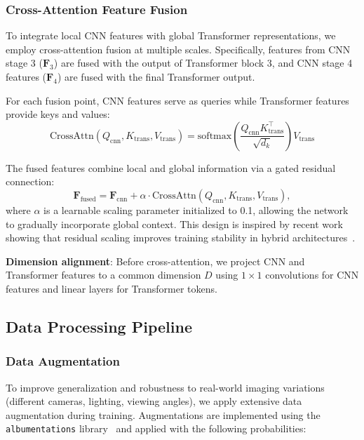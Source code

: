 \subsubsection{Cross-Attention Feature Fusion}

To integrate local CNN features with global Transformer representations, we employ cross-attention fusion at multiple scales. Specifically, features from CNN stage 3 ($\mathbf{F}_3$) are fused with the output of Transformer block 3, and CNN stage 4 features ($\mathbf{F}_4$) are fused with the final Transformer output.

For each fusion point, CNN features serve as queries while Transformer features provide keys and values:
\begin{equation}
\mathrm{CrossAttn}(Q_{\text{cnn}}, K_{\text{trans}}, V_{\text{trans}})
=
\mathrm{softmax}\!\left(
\frac{Q_{\text{cnn}} K_{\text{trans}}^\top}{\sqrt{d_k}}
\right)
V_{\text{trans}}
\end{equation}



The fused features combine local and global information via a gated residual connection:
\begin{equation}
\mathbf{F}_{\text{fused}} =
\mathbf{F}_{\text{cnn}} + \alpha \cdot
\mathrm{CrossAttn}(Q_{\text{cnn}}, K_{\text{trans}}, V_{\text{trans}}),
\label{eq:fusion}
\end{equation}
where $\alpha$ is a learnable scaling parameter initialized to 0.1, allowing the network to gradually incorporate global context. This design is inspired by recent work showing that residual scaling improves training stability in hybrid architectures~\cite{touvron2021training}.

\textbf{Dimension alignment}: Before cross-attention, we project CNN and Transformer features to a common dimension $D$ using $1 \times 1$ convolutions for CNN features and linear layers for Transformer tokens.

\subsection{Data Processing Pipeline}
\label{subsec:data_pipeline}

\subsubsection{Data Augmentation}

To improve generalization and robustness to real-world imaging variations (different cameras, lighting, viewing angles), we apply extensive data augmentation during training. Augmentations are implemented using the \texttt{albumentations} library~\cite{albumentations} and applied with the following probabilities:

